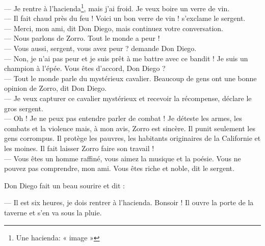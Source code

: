 --- Je rentre à l'hacienda\footnote{Une hacienda: « image »}, mais j'ai froid. Je veux boire un verre de vin.\\
--- Il fait chaud près du feu ! Voici un bon verre de vin ! s'exclame le sergent.\\
--- Merci, mon ami, dit Don Diego, mais continuez votre conversation.\\
--- Nous parlons de Zorro. Tout le monde a peur !\\
--- Vous aussi, sergent, vous avez peur ? demande Don Diego.\\
--- Non, je n'ai pas peur et je suis prêt à me battre avec ce bandit ! Je suis un champion à l'épée. Vous êtes d'accord, Don
    Diego ?\\
--- Tout le monde parle du mystérieux cavalier. Beaucoup de gens ont une bonne opinion de Zorro, dit Don Diego.\\
--- Je veux capturer ce cavalier mystérieux et recevoir la récompense, déclare le gros sergent.\\
--- Oh ! Je ne peux pas entendre parler de combat ! Je déteste les armes, les combats et la violence mais, à mon avis, Zorro est
    sincère. Il punit seulement les gens corrompus. Il protège les pauvres, les habitants originaires de la Californie et les
    moines. Il fait laisser Zorro faire son travail !\\
--- Vous êtes un homme raffiné, vous aimez la musique et la poésie. Vous ne pouvez pas comprendre, mon ami. Vous êtes riche et
    noble, dit le sergent.

Don Diego fait un beau sourire et dit :

--- Il est six heures, je dois rentrer à l'hacienda. Bonsoir ! Il ouvre la porte de la taverne et s'en va sous la pluie.

